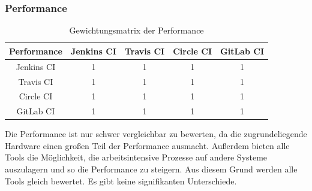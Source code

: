 \subsubsection{Performance}
\begin{table}[h!]
	\centering
	\begin{tabular}{c|cccc}
		Performance   & Jenkins CI		 & Travis CI& Circle CI & GitLab CI   \\ 
		\hline
		Jenkins CI      & 1     		      &        1       &     1       &     1     \\
		Travis CI &   1   & 1               &  1&1     \\
		Circle CI   &  1   & 1   & 1            & 1  \\
		GitLab CI    &   1    &  1  &      1      & 1           \\
	\end{tabular}
	\caption{Gewichtungsmatrix der Performance}
\end{table}
Die Performance ist nur schwer vergleichbar zu bewerten, da die zugrundeliegende Hardware einen großen Teil der Performance ausmacht. Außerdem bieten alle Tools die Möglichkeit, die arbeitsintensive Prozesse auf andere Systeme auszulagern und so die Performance zu steigern. Aus diesem Grund werden alle Tools gleich bewertet. Es gibt keine signifikanten Unterschiede.
